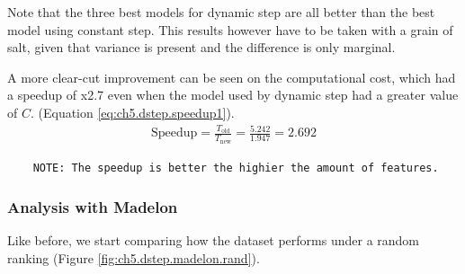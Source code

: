 Note that the three best models for dynamic step are all better than the best model using constant step. This results however have to be taken with a grain of salt, given that variance is present and the difference is only marginal.

A more clear-cut improvement can be seen on the computational cost, which had a speedup of x2.7 even when the model used by dynamic step had a greater value of $C$. (Equation \ref{eq:ch5.dstep.speedup1}).
\label{eq:ch5.dstep.speedup1}
\begin{align}
    \text{Speedup} = \frac{T_{\text{old}}}{T_{\text{new}}} = \frac{5.242}{1.947} = 2.692
\end{align}

\begin{verbatim}
    NOTE: The speedup is better the highier the amount of features.
\end{verbatim}


\subsubsection*{Analysis with Madelon}

Like before, we start comparing how the dataset performs under a random ranking (Figure \ref{fig:ch5.dstep.madelon.rand}).

